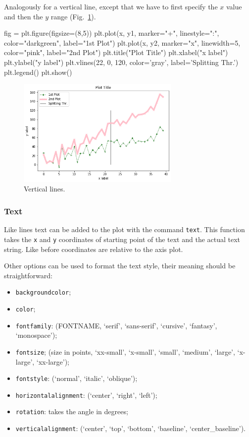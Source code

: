 \begin{ipython}
Analogously for a vertical line, except that we have to first specify
the \(x\) value and then the \(y\) range (Fig.~\ref{fig:lines2}).

\begin{ipython}
fig = plt.figure(figsize=(8,5))
plt.plot(x, y1, marker="+", linestyle=":", color="darkgreen", label="1st Plot")
plt.plot(x, y2, marker="x", linewidth=5, color="pink", label="2nd Plot")
plt.title("Plot Title")
plt.xlabel("x label")
plt.ylabel("y label")
plt.vlines(22, 0, 120, color='gray', label='Splitting Thr.')
plt.legend()
plt.show()
\end{ipython}

\begin{figure}[htb]
	\centering
	\includegraphics[width=0.7\textwidth]{figures/lines2}
	\caption{Vertical lines.}
	\label{fig:lines2}
\end{figure}

\subsubsection{Text}\label{text}

Like lines text can be added to the plot with the command \texttt{text}.
This function takes the \texttt{x} and \texttt{y} coordinates of starting point of
the text and the actual text string. Like before coordinates are
relative to the axis plot.

Other options can be used to format the text style, their meaning should
be straightforward:

\begin{itemize}
	\tightlist
	\item
	\texttt{backgroundcolor};
	\item
	\texttt{color};
	\item
	\texttt{fontfamily}: (FONTNAME, `serif', `sans-serif', `cursive', `fantasy', `monospace');
	\item
	\texttt{fontsize}; (size in points, `xx-small', `x-small', `small', `medium', `large', `x-large', `xx-large');
	\item
	\texttt{fontstyle}: (`normal', `italic', `oblique');
	\item
	\texttt{horizontalalignment}: (`center', `right', `left');
	\item
	\texttt{rotation}: takes the angle in degrees;
	\item
	\texttt{verticalalignment}: (`center', `top', `bottom', `baseline', `center\_baseline').
\end{itemize}


\end{ipython}
